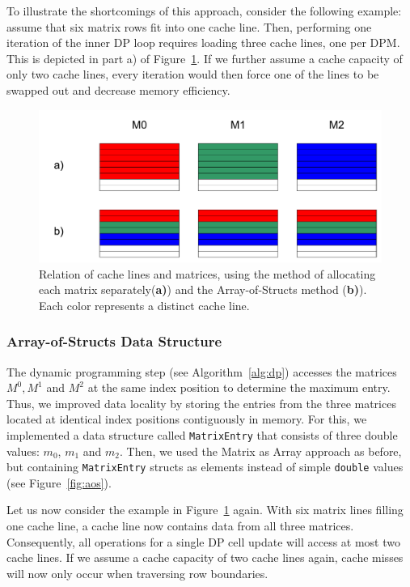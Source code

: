 \documentclass[runningheads,a4paper]{llncs}
\begin{document}
To illustrate the shortcomings of this approach, consider the following example: assume that six matrix rows fit into one cache line. 
Then, performing one iteration of the inner DP loop requires loading three cache lines, one per DPM. 
This is depicted in part a) of Figure~\ref{fig:cachelines}.
If we further assume a cache capacity of only two cache lines, 
every iteration would then force one of the lines to be swapped out and decrease memory efficiency.

\begin{figure}
\centering
\includegraphics[width=\textwidth]{images/cachelines.pdf}
\caption{Relation of cache lines and matrices, using the method of allocating each matrix separately(\textbf{a)}) and the Array-of-Structs method (\textbf{b)}). 
Each color represents a distinct cache line.}
\label{fig:cachelines}
\end{figure}

\subsubsection{Array-of-Structs Data Structure}
The dynamic programming step (see Algorithm~\ref{alg:dp}) accesses the matrices $M^0, M^1$ and $M^2$ at the same index position to determine the maximum entry. 
Thus, we improved data locality by storing the entries from the three matrices located at identical index positions contiguously in memory. 
For this, we implemented a data structure called \texttt{MatrixEntry} that consists of three double values: \texttt{$m_0$}, \texttt{$m_1$} and \texttt{$m_2$}. 
Then, we used the Matrix as Array approach as before, but containing \texttt{MatrixEntry} structs as elements instead of simple 
\texttt{double} values (see Figure~\ref{fig:aos}). 

Let us now consider the example in Figure~\ref{fig:cachelines} again. 
With six matrix lines filling one cache line, a cache line now contains data from all three matrices. 
Consequently, all operations for a single DP cell update 
will access at most two cache lines. 
If we assume a cache capacity of two cache lines again, cache misses will now only occur when traversing row boundaries.
\end{document}

